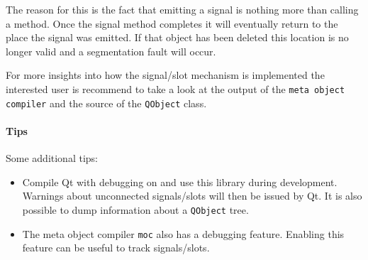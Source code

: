 The reason for this is the fact that emitting a signal is nothing more than
calling a method. Once the signal method completes it will eventually return to
the place the signal was emitted. If that object has been deleted this location
is no longer valid and a segmentation fault will occur.

For more insights into how the signal/slot mechanism is implemented the
interested user is recommend to take a look at the output of the
\verb=meta object compiler= and the source of the \verb=QObject= class.

\bigskip \noindent
\paragraph{Tips\\}
Some additional tips:
\begin{itemize}
\item Compile Qt with debugging on and use this library during development.
Warnings about unconnected signals/slots will then be issued by Qt. It is also
possible to dump information about a \verb=QObject= tree.
\item The meta object compiler \verb=moc= also has a debugging feature.
Enabling this feature can be useful to track signals/slots.
\end{itemize}
